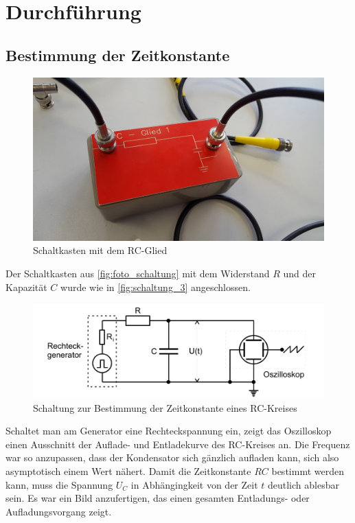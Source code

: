 \section{Durchführung}
\label{sec:Durchführung}
\subsection{Bestimmung der Zeitkonstante}
\label{sec:Durchführung_1}
\begin{figure}
    \centering
    \includegraphics[width=\textwidth/2]{images/foto_schaltung.jpg}
    \caption{Schaltkasten mit dem RC-Glied  \cite{V353}}
    \label{fig:foto_schaltung}
\end{figure}

Der Schaltkasten aus \autoref{fig:foto_schaltung} mit dem Widerstand $R$ und der Kapazität $C$ wurde wie in \autoref{fig:schaltung_3} angeschlossen.

\begin{figure}
    \centering
    \includegraphics[width=\textwidth/2]{images/schaltung_3.png}
    \caption{Schaltung zur Bestimmung der Zeitkonstante eines RC-Kreises  \cite{V353}}
    \label{fig:schaltung_3}
\end{figure}

Schaltet man am Generator eine Rechteckspannung ein, zeigt das Oszilloskop einen Ausschnitt der Auflade- und Entladekurve des RC-Kreises an. Die Frequenz war so anzupassen, dass der Kondensator sich gänzlich aufladen kann, sich also asymptotisch einem Wert nähert. Damit die Zeitkonstante $RC$ bestimmt werden kann, muss die Spannung $U_C$ in Abhängingkeit von der Zeit $t$ deutlich ablesbar sein. Es war ein Bild anzufertigen, das einen gesamten Entladungs- oder Aufladungsvorgang zeigt. 

